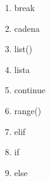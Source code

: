 
\begin{multicols}{4}
  \begin{enumerate}
    \item break
    \item cadena
    \item list()
    \item lista
    \item continue
    \item range()
    \item elif
    \item if
    \item else
  \end{enumerate}
\end{multicols}
